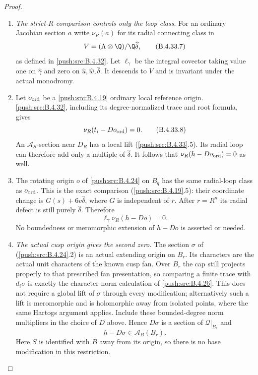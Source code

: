 \begin{proof}
\begin{enumerate}[label=\arabic*.,leftmargin=*]
\item \emph{The strict-$R$ comparison controls only the loop class.}
For an ordinary Jacobian section $a$
write $\nu_R(a)$ for its radial connecting
class in
\[
 V=(\Lambda\otimes\Q)/\Q\widehat\delta,
 \tag{B.4.33.7}
\]
as defined in \ref{push:src:B.4.32}. Let $\ell_\gamma$
be the integral covector taking value one
on $\widehat\gamma$ and zero on
$\widehat u,\widehat w,\widehat\delta$.
It descends to $V$ and is invariant under
the actual monodromy.

\item Let $o_{\rm ord}$ be a \ref{push:src:B.4.19} ordinary
local reference origin. \ref{push:src:B.4.32}, including
its degree-normalized trace and root
formula, gives
\[
 \nu_R(t_i-D o_{\rm ord})=0.
 \tag{B.4.33.8}
\]
An $\mathcal A_S$-section near $D_R$
has a local lift (\ref{push:src:B.4.33}.5). Its radial
loop can therefore add only a multiple
of $\widehat\delta$. It follows that
$\nu_R(h-D o_{\rm ord})=0$ as well.

\item The rotating origin $o$ of \ref{push:src:B.4.24} on
$B_q$ has the same radial-loop class
as $o_{\rm ord}$. This is the exact
comparison (\ref{push:src:B.4.19}.5): their coordinate
change is $G(s)+6v\widehat\delta$,
where $G$ is independent of $r$.
After $r=R^n$ its radial defect is still
purely $\widehat\delta$. Therefore
\[
 \ell_\gamma\nu_R(h-D o)=0.
 \tag{B.4.33.9}
\]
No boundedness or meromorphic extension
of $h-D o$ is asserted or needed.

\item \emph{The actual cusp origin gives the second zero.}
The section $\sigma$ of (\ref{push:src:B.4.24}.2)
is an actual extending origin on $B_r$.
Its characters are the actual unit
characters of the known cusp fan.
Over $B_r$ the cap still projects properly
to that prescribed fan presentation,
so comparing a finite trace with
$d_i\sigma$ is exactly the character-norm
calculation of \ref{push:src:B.4.26}. This does not
require a global lift of $\sigma$
through every modification; alternatively
such a lift is meromorphic and is
holomorphic away from isolated points,
where the same Hartogs argument applies.
Include these bounded-degree norm
multipliers in the choice of $D$ above.
Hence $D\sigma$ is a
section of $\mathcal Q|_{B_r}$ and
\[
                  h-D\sigma\in
                         \mathcal A_B(B_r).
 \tag{B.4.33.10}
\]
Here $S$ is identified with $B$ away
from its origin, so there is no base
modification in this restriction.


\end{enumerate}
\end{proof}
